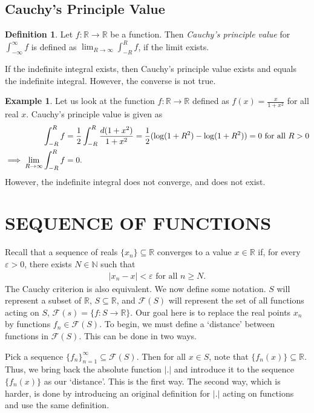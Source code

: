 \documentclass[15pt,a4paper]{book}
\theoremstyle{definition}
\newtheorem{definition}[theorem]{Definition}
\newtheorem{example}[theorem]{Example}
\newcommand{\eax}[1]{\emph{#1}\index{#1}} %
\newcommand{\abs}[1]{\left| #1 \right|} %
\newcommand{\N}{\mathbb{N}} %
\newcommand{\R}{\mathbb{R}} %
\newcommand{\cF}{\mathcal{F}}
\begin{document}
\section{Cauchy's Principle Value}
\begin{definition}
    Let $f:\R \to \R$ be a function. Then \eax{Cauchy's principle value} for $\int_{-\infty}^{\infty}f$ is defined as $\lim_{R \to \infty} \int_{-R}^{R} f$, if the limit exists.
\end{definition}
If the indefinite integral exists, then Cauchy's principle value exists and equals the indefinite integral. However, the converse is not true.

\begin{example}
    Let us look at the function $f:\R \to \R$ defined as $f(x) = \frac{x}{1+x^{2}}$ for all real $x$. Cauchy's principle value is given as
    \begin{align}
        \int_{-R}^{R} f &= \frac{1}{2}\int_{-R}^{R} \frac{d(1+x^{2})}{1+x^{2}} = \frac{1}{2} (\log (1+R^{2}) - \log (1+R^{2})) = 0 \text{ for all } R > 0 \notag \\
        \implies \lim_{R \to \infty} \int_{-R}^{R} f &= 0.
    \end{align}
    However, the indefinite integral does not converge, and does not exist.
\end{example}


\chapter{SEQUENCE OF FUNCTIONS}

Recall that a sequence of reals $\{x_{n}\} \subseteq \R$ converges to a value $x \in \R$ if, for every $\varepsilon > 0$, there exists $N \in \N$ such that
\begin{align}
    \abs{x_{n}-x} < \varepsilon \text{ for all } n \geq N.
\end{align}
The Cauchy criterion is also equivalent. We now define some notation. $S$ will represent a subset of $\R$, $S \subseteq \R$, and $\cF(S)$ will represent the set of all functions acting on $S$, $\cF(s) = \{f:S \to \R\}$. Our goal here is to replace the real points $x_{n}$ by functions $f_{n} \in \cF(S)$. To begin, we must define a `distance' between functions in $\cF(S)$. This can be done in two ways.

Pick a sequence $\{f_{n}\}_{n=1}^{\infty} \subseteq \cF(S)$. Then for all $x \in S$, note that $\{f_{n}(x)\} \subseteq \R$. Thus, we bring back the absolute function $\abs{.}$ and introduce it to the sequence $\{f_{n}(x)\}$ as our `distance'. This is the first way. The second way, which is harder, is done by introducing an original definition for $\abs{.}$ acting on functions and use the same definition.
\end{document}
